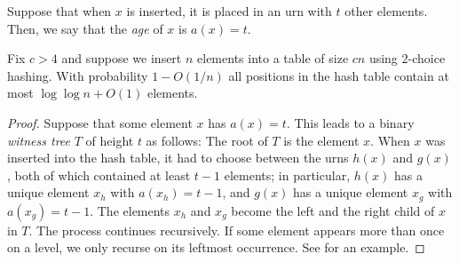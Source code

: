 \documentclass{patmorin}
\begin{document}
Suppose that when $x$ is inserted, it is placed in an urn with $t$
other elements. Then, we say that the \emph{age} of $x$ is $a(x) = t$.
\begin{thm}
  Fix $c > 4$ and
  suppose we insert $n$ elements into a table of size $cn$
  using $2$-choice hashing.
  With probability $1 - O(1/n)$
  all positions in the hash table contain at most 
  $\log \log n + O(1)$ elements.
\end{thm}
\begin{proof}
  Suppose that some element $x$ has $a(x) = t$. This leads to a binary
  \emph{witness tree} $T$ of height $t$ as follows: The root of $T$ is
  the element $x$. When $x$ was inserted into the hash table, it had
  to choose between the urns $h(x)$ and $g(x)$, both of which
  contained at least $t - 1$ elements; in particular, $h(x)$ has a unique
  element $x_h$ with $a(x_h) = t - 1$, and $g(x)$ has a unique 
  element $x_g$
  with $a(x_g) = t - 1$. The elements $x_h$ and $x_g$ become the left and
  the right child of $x$ in $T$. The process continues recursively. If
  some element appears more than once on a level, we only recurse on
  its leftmost occurrence. See  for an example. 


\end{proof}
\end{document}
